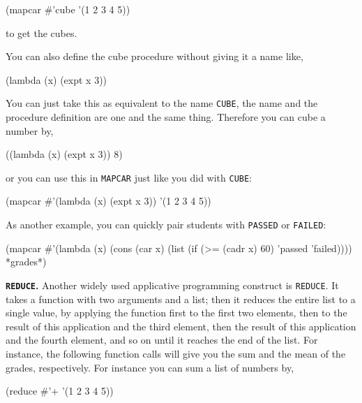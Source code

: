 \documentclass[a4paper,11pt]{article}
\begin{document}
\begin{uenum}
\begin{lispcode}
(mapcar #'cube '(1 2 3 4 5))
\end{lispcode}

to get the cubes.

You can also define the cube procedure without giving it a name like,

\begin{lispcode}
(lambda (x) (expt x 3))
\end{lispcode}

You can just take this as equivalent to the name \Verb+CUBE+, the name and the procedure definition are one and the same thing. Therefore you can cube a number by,

\begin{lispcode}
((lambda (x) (expt x 3)) 8)
\end{lispcode}

or you can use this in \Verb+MAPCAR+ just like you did with \Verb+CUBE+:

\begin{lispcode}
(mapcar #'(lambda (x) (expt x 3)) '(1 2 3 4 5))
\end{lispcode}

\begin{uenumi}
\item As another example, you can quickly pair students with \Verb+PASSED+ or \Verb+FAILED+: 

\begin{lispcode}
(mapcar
  #'(lambda (x)
      (cons (car x)
            (list (if (>= (cadr x) 60) 'passed 'failed))))
  *grades*)
\end{lispcode}

\end{uenumi}

\item {\bf \Verb+REDUCE+.} Another widely used applicative programming construct is \Verb+REDUCE+. It takes a function with two arguments and a list; then it reduces the entire list to a single value, by applying the function first to the first two elements, then to the result of this application and the third element, then the result of this application and the fourth element, and so on until it reaches the end of the list. For instance, the following function calls will give you the sum and the mean of the grades, respectively. For instance you can sum a list of numbers by,

\begin{lispcode}
(reduce #'+ '(1 2 3 4 5))
\end{lispcode}


\end{uenum}
\end{document}
